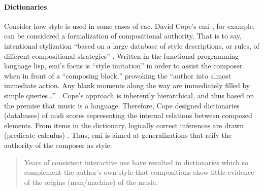 
\paragraph{Dictionaries}
Consider how style is used in some cases of \gls{cac}. David Cope's \gls{emi} \parencite{DBLP:conf/icmc/Cope87}, for example, can be considered a formalization of compositional authority. That is to say, intentional stylization ``based on a large database of style descriptions, or rules, of different compositional strategies'' \parencite[3]{Mau99:Abr}. Written in the functional programming language \gls{lisp}, \gls{emi}'s focus is ``style imitation'' in order to assist the composer when in front of a ``composing block,'' provoking the ``author into almost immediate action. Any blank moments along the way are immediately filled by simple queries\dots'' \parencite[38]{Cop87:AnE}. Cope's approach is inherently hierarchical, and thus based on the premise that music is a language. Therefore, Cope designed dictionaries (databases) of \gls{midi} scores representing the internal relations between composed elements. From items in the dictionary, logically correct inferences are drawn (predicate calculus) \parencite[1]{DBLP:conf/icmc/Cope87}. Thus, \gls{emi} is aimed at generalizations that reify the authority of the composer as style: 

\begin{quote}
	Years of consistent interactive use have resulted in dictionaries which so complement the author's own style that compositions show little evidence of the origins (man/machine) of the music. \parencite[179]{DBLP:conf/icmc/Cope87}
\end{quote}





